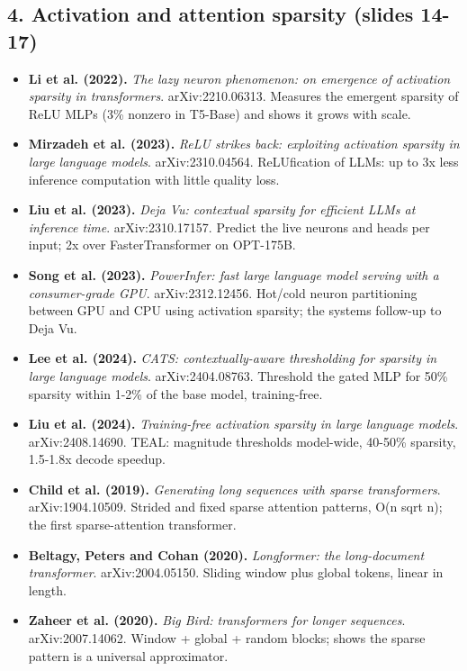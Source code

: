 \documentclass[11pt,letterpaper]{article}
\begin{document}
\subsection*{4. Activation and attention sparsity (slides 14-17)}
\begin{itemize}[leftmargin=1.2em,itemsep=3pt]\sloppy
\item \textbf{Li et al. (2022).} \textit{The lazy neuron phenomenon: on emergence of activation sparsity in transformers}. arXiv:2210.06313. Measures the emergent sparsity of ReLU MLPs (3\% nonzero in T5-Base) and shows it grows with scale.
\item \textbf{Mirzadeh et al. (2023).} \textit{ReLU strikes back: exploiting activation sparsity in large language models}. arXiv:2310.04564. ReLUfication of LLMs: up to 3x less inference computation with little quality loss.
\item \textbf{Liu et al. (2023).} \textit{Deja Vu: contextual sparsity for efficient LLMs at inference time}. arXiv:2310.17157. Predict the live neurons and heads per input; 2x over FasterTransformer on OPT-175B.
\item \textbf{Song et al. (2023).} \textit{PowerInfer: fast large language model serving with a consumer-grade GPU}. arXiv:2312.12456. Hot/cold neuron partitioning between GPU and CPU using activation sparsity; the systems follow-up to Deja Vu.
\item \textbf{Lee et al. (2024).} \textit{CATS: contextually-aware thresholding for sparsity in large language models}. arXiv:2404.08763. Threshold the gated MLP for 50\% sparsity within 1-2\% of the base model, training-free.
\item \textbf{Liu et al. (2024).} \textit{Training-free activation sparsity in large language models}. arXiv:2408.14690. TEAL: magnitude thresholds model-wide, 40-50\% sparsity, 1.5-1.8x decode speedup.
\item \textbf{Child et al. (2019).} \textit{Generating long sequences with sparse transformers}. arXiv:1904.10509. Strided and fixed sparse attention patterns, O(n sqrt n); the first sparse-attention transformer.
\item \textbf{Beltagy, Peters and Cohan (2020).} \textit{Longformer: the long-document transformer}. arXiv:2004.05150. Sliding window plus global tokens, linear in length.
\item \textbf{Zaheer et al. (2020).} \textit{Big Bird: transformers for longer sequences}. arXiv:2007.14062. Window + global + random blocks; shows the sparse pattern is a universal approximator.

\end{itemize}
\end{document}
